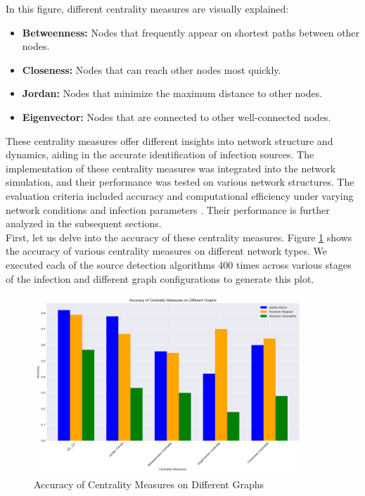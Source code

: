 In this figure, different centrality measures are visually explained:
\begin{itemize}
    \item \textbf{Betweenness:} Nodes that frequently appear on shortest paths between other nodes.
    \item \textbf{Closeness:} Nodes that can reach other nodes most quickly.
    \item \textbf{Jordan:} Nodes that minimize the maximum distance to other nodes.
    \item \textbf{Eigenvector:} Nodes that are connected to other well-connected nodes.
\end{itemize}

These centrality measures offer different insights into network structure and dynamics, aiding in the accurate identification of infection sources. The implementation of these centrality measures was integrated into the network simulation, and their performance was tested on various network structures. The evaluation criteria included accuracy and computational efficiency under varying network conditions and infection parameters \cite{liu2011}. Their performance is further analyzed in the subsequent sections.\\

First, let us delve into the accuracy of these centrality measures. Figure \ref{fig:accuracy_centrality_measures} shows the accuracy of various centrality measures on different network types. We executed each of the source detection algorithms 400 times across various stages of the infection and different graph configurations to generate this plot.

\begin{figure}[H]
    \centering
    \includegraphics[width=0.9\textwidth]{Accuracy_Centrality_Measures.png}
    \caption{Accuracy of Centrality Measures on Different Graphs}
    \label{fig:accuracy_centrality_measures}
\end{figure}

